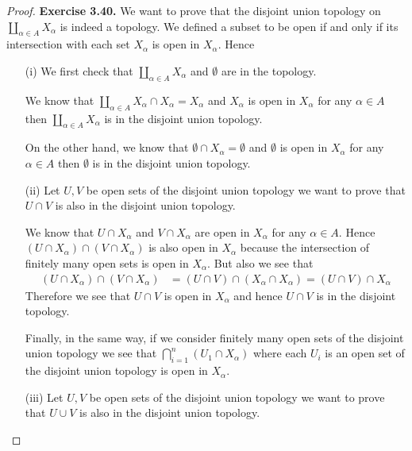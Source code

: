 \documentclass[11pt]{article}
\theoremstyle{definition}
\begin{document}
\cleardoublepage
\begin{proof}{\textbf{Exercise 3.40.}}
    We want to prove that the disjoint union topology on
    $\coprod_{\alpha \in A} X_\alpha$ is indeed a topology.
    We defined a subset to be open if and only if its intersection with each
    set $X_\alpha$ is open in $X_\alpha$. Hence
    \begin{itemize}
        \item[(i)] We first check that $\coprod_{\alpha \in A} X_\alpha$ and
        $\emptyset$ are in the topology.
        
        We know that $\coprod_{\alpha \in A} X_\alpha \cap X_\alpha = X_\alpha$
        and $X_\alpha$ is open in $X_\alpha$ for any $\alpha \in A$ then
        $\coprod_{\alpha \in A} X_\alpha$ is in the disjoint union topology.

        On the other hand, we know that $\emptyset \cap X_\alpha = \emptyset$
        and $\emptyset$ is open in $X_\alpha$ for any $\alpha \in A$ then
        $\emptyset$ is in the disjoint union topology.

        \item[(ii)] Let $U, V$ be open sets of the disjoint union topology
        we want to prove that $U \cap V$ is also in the disjoint union
        topology.

        We know that $U \cap X_\alpha$ and $V \cap X_\alpha$ are open in
        $X_\alpha$ for any $\alpha \in A$. Hence
        $(U \cap X_\alpha) \cap (V \cap X_\alpha)$
        is also open in $X_\alpha$ because the intersection
        of finitely many open sets is open in $X_\alpha$. But also we see that
        \begin{align*}
            (U \cap X_\alpha) \cap (V \cap X_\alpha)
            &= (U \cap V) \cap (X_\alpha \cap X_\alpha)
            = (U \cap V) \cap X_\alpha
        \end{align*}
        Therefore we see that $U \cap V$ is open in $X_\alpha$ and hence
        $U \cap V$ is in the disjoint topology.
        
        Finally, in the same way, if we consider finitely
        many open sets of the disjoint union topology we see that
        $\bigcap_{i=1}^n (U_1 \cap X_\alpha)$ where each $U_i$ is an open set
        of the disjoint union topology is open in $X_\alpha$.

        \item[(iii)] Let $U, V$ be open sets of the disjoint union topology
        we want to prove that $U \cup V$ is also in the disjoint union
        topology.
        

\end{itemize}
\end{proof}
\end{document}
